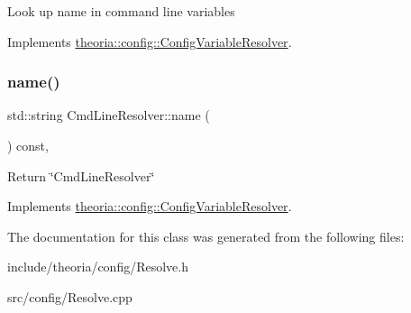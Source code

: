 Look up name in command line variables 

Implements \hyperlink{classtheoria_1_1config_1_1ConfigVariableResolver}{theoria\+::config\+::\+Config\+Variable\+Resolver}.

\mbox{\label{classtheoria_1_1config_1_1CmdLineResolver_ab42f0d86e62e985ee0bc94947df46a74}} 
\subsubsection{\texorpdfstring{name()}{name()}}
{\footnotesize\ttfamily std\+::string Cmd\+Line\+Resolver\+::name (\begin{DoxyParamCaption}{ }\end{DoxyParamCaption}) const\hspace{0.3cm}{\ttfamily [override]}, {\ttfamily [virtual]}}

Return \char`\"{}\+Cmd\+Line\+Resolver\char`\"{} 

Implements \hyperlink{classtheoria_1_1config_1_1ConfigVariableResolver_a026bda729faf988eaef334a45ec92303}{theoria\+::config\+::\+Config\+Variable\+Resolver}.



The documentation for this class was generated from the following files\+:\begin{DoxyCompactItemize}
\item 
include/theoria/config/Resolve.\+h\item 
src/config/Resolve.\+cpp\end{DoxyCompactItemize}
